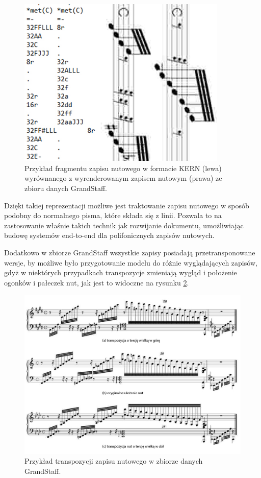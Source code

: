 \begin{figure}
	\centering
	\includegraphics[width=10cm]{images/kern-nuty.jpg}
	\caption{Przykład fragmentu zapisu nutowego w formacie KERN (lewa) wyrównanego z wyrenderowanym zapisem nutowym (prawa) ze zbioru danych GrandStaff.}
	\label{fig:kern-score}
\end{figure}

Dzięki takiej reprezentacji możliwe jest traktowanie zapisu nutowego w sposób podobny do normalnego pisma, które składa się z linii. Pozwala to na zastosowanie właśnie takich technik jak rozwijanie dokumentu\cite{Coquenet2021}, umożliwiając budowę systemów end-to-end dla polifonicznych zapisów nutowych.

Dodatkowo w zbiorze GrandStaff wszystkie zapisy posiadają przetransponowane wersje, by możliwe było przygotowanie modelu do różnie wyglądających zapisów, gdyż w niektórych przypadkach transpozycje zmieniają wygląd i położenie ogonków i pałeczek nut, jak jest to widoczne na rysunku \ref{fig:score-transposition}.

\begin{figure}[h]
	\centering
	\includegraphics[width=14cm]{images/grandstaff-transpozycje.jpg}
	\caption{Przykład transpozycji zapisu nutowego w zbiorze danych GrandStaff.}
	\label{fig:score-transposition}
\end{figure}

